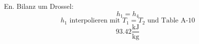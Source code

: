 

\item[c)] En. Bilanz um Drossel:
    \[
    h_1 = h_4
    \]
    \[
    h_1 \text{ interpolieren mit } T_1 = T_2 \text{ und Table A-10}
    \]
    \[
    93.42 \frac{\text{kJ}}{\text{kg}}
    \]